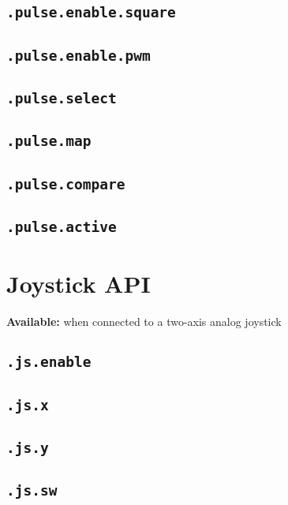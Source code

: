 \documentclass{article}
\begin{document}
\subsection{\texttt{.pulse.enable.square}}
\subsection{\texttt{.pulse.enable.pwm}}
\subsection{\texttt{.pulse.select}}
\subsection{\texttt{.pulse.map}}
\subsection{\texttt{.pulse.compare}}
\subsection{\texttt{.pulse.active}}

\section{Joystick API}
\textbf{Available:} when connected to a two-axis analog joystick

\subsection{\texttt{.js.enable}}
\subsection{\texttt{.js.x}}
\subsection{\texttt{.js.y}}
\subsection{\texttt{.js.sw}}
\end{document}
